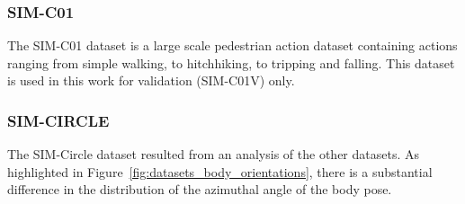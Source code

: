 \documentclass[a4paper, 10pt, conference]{ieeeconf}
\begin{document}
\subsubsection{SIM-C01}
The SIM-C01 dataset is a large scale pedestrian action dataset containing actions ranging from simple walking, to hitchhiking, to tripping and falling. This dataset is used in this work for validation (SIM-C01V) only.

\subsubsection{SIM-CIRCLE}
The SIM-Circle dataset resulted from an analysis of the other datasets. As highlighted in Figure~\ref{fig:datasets_body_orientations}, there is a substantial difference in the distribution of the azimuthal angle  of the body pose.
\end{document}
